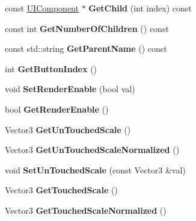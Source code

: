 \begin{DoxyCompactItemize}
\mbox{\label{classUIComponent_adb25a8abbfbcd980b5415315b7c4da3c}} 
const \hyperlink{classUIComponent}{U\+I\+Component} $\ast$ {\bfseries Get\+Child} (int index) const
\item 
\mbox{\label{classUIComponent_ae6d41c31f9dea151b518164d5f7ffe91}} 
const int {\bfseries Get\+Number\+Of\+Children} () const
\item 
\mbox{\label{classUIComponent_a22f923d6805f5034836ca06ff7579729}} 
const std\+::string {\bfseries Get\+Parent\+Name} () const
\item 
\mbox{\label{classUIComponent_afcd30b071ba3255994029c3fa216d162}} 
int {\bfseries Get\+Button\+Index} ()
\item 
\mbox{\label{classUIComponent_ac91e12dc794bb30f8f867862c49b1410}} 
void {\bfseries Set\+Render\+Enable} (bool val)
\item 
\mbox{\label{classUIComponent_aeb1eb9113d271651453100f4b1bceb5c}} 
bool {\bfseries Get\+Render\+Enable} ()
\item 
\mbox{\label{classUIComponent_a1d49394ef822dd7ce1c2a5ce7b67966f}} 
Vector3 {\bfseries Get\+Un\+Touched\+Scale} ()
\item 
\mbox{\label{classUIComponent_ab38a81650988a482fe95bc593b051569}} 
Vector3 {\bfseries Get\+Un\+Touched\+Scale\+Normalized} ()
\item 
\mbox{\label{classUIComponent_a1c8558f61451d7718ebb63b2105a3e93}} 
void {\bfseries Set\+Un\+Touched\+Scale} (const Vector3 \&val)
\item 
\mbox{\label{classUIComponent_acf70841ffe9f4eacb572121f4f8e5588}} 
Vector3 {\bfseries Get\+Touched\+Scale} ()
\item 
\mbox{\label{classUIComponent_ac857805fd369d969cb06ab60cbfe70ce}} 
Vector3 {\bfseries Get\+Touched\+Scale\+Normalized} ()
\item 
\mbox{\label{classUIComponent_a7920aca794a69343c1e16d1c457c328b}} 

\end{DoxyCompactItemize}
